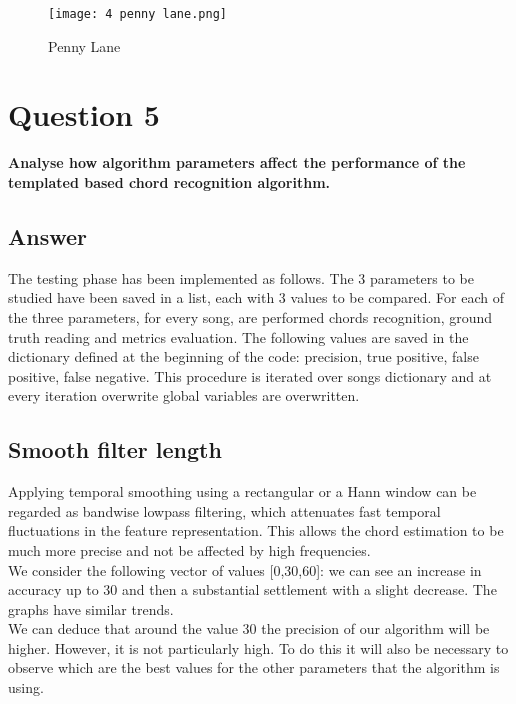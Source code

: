 \documentclass{article}
\begin{document}
\begin{figure}[H]
 \centering
 \texttt{[image: 4 penny lane.png]}
 \caption{Penny Lane}
\end{figure}


\section*{\color{red}Question 5}

\begin{problem}
	\textbf{Analyse how algorithm parameters affect the performance of the templated based chord recognition algorithm.}
\end{problem}

\subsection*{\color{blue}Answer}

The testing phase has been implemented as follows. The 3 parameters to be studied have been saved in a list, each with 3 values to be compared. For each of the three parameters, for every song, are performed chords recognition, ground truth reading and metrics evaluation. The following values are saved in the dictionary defined at the beginning of the code: precision, true positive, false positive, false negative.
This procedure is iterated over songs dictionary and at every iteration overwrite global variables are overwritten.

\subsection*{Smooth filter length} 

Applying temporal smoothing using a rectangular or a Hann window can be regarded as bandwise lowpass filtering, which attenuates fast temporal fluctuations in the feature representation. This allows the chord estimation to be much more precise and not be affected by high frequencies. \\
We consider the following vector of values [0,30,60]: we can see an increase in accuracy up to 30 and then a substantial settlement with a slight decrease. The graphs have similar trends.\\
We can deduce that around the value 30 the precision of our algorithm will be higher. However, it is not particularly high. To do this it will also be necessary to observe which are the best values for the other parameters that the algorithm is using. \\
\end{document}

